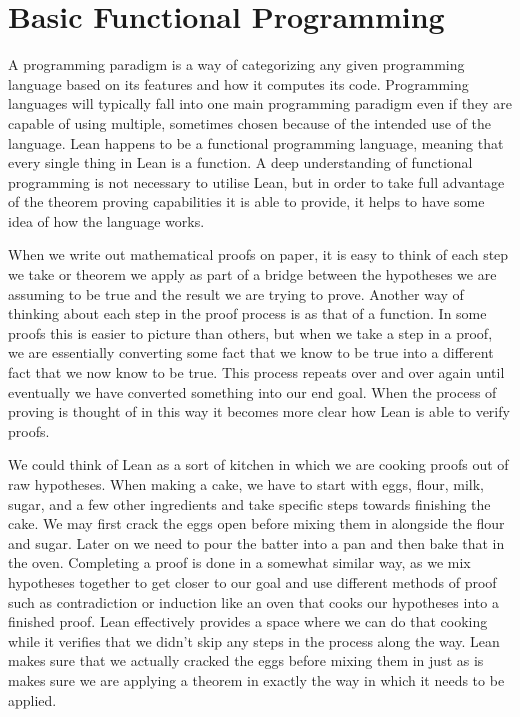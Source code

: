 \documentclass[
  letterpaper,
]{scrreprt}
\theoremstyle{remark}
\begin{document}
\hypertarget{basic-functional-programming}{%
\section{Basic Functional
Programming}\label{basic-functional-programming}}

A programming paradigm is a way of categorizing any given programming
language based on its features and how it computes its code. Programming
languages will typically fall into one main programming paradigm even if
they are capable of using multiple, sometimes chosen because of the
intended use of the language. Lean happens to be a functional
programming language, meaning that every single thing in Lean is a
function. A deep understanding of functional programming is not
necessary to utilise Lean, but in order to take full advantage of the
theorem proving capabilities it is able to provide, it helps to have
some idea of how the language works.

When we write out mathematical proofs on paper, it is easy to think of
each step we take or theorem we apply as part of a bridge between the
hypotheses we are assuming to be true and the result we are trying to
prove. Another way of thinking about each step in the proof process is
as that of a function. In some proofs this is easier to picture than
others, but when we take a step in a proof, we are essentially
converting some fact that we know to be true into a different fact that
we now know to be true. This process repeats over and over again until
eventually we have converted something into our end goal. When the
process of proving is thought of in this way it becomes more clear how
Lean is able to verify proofs.

We could think of Lean as a sort of kitchen in which we are cooking
proofs out of raw hypotheses. When making a cake, we have to start with
eggs, flour, milk, sugar, and a few other ingredients and take specific
steps towards finishing the cake. We may first crack the eggs open
before mixing them in alongside the flour and sugar. Later on we need to
pour the batter into a pan and then bake that in the oven. Completing a
proof is done in a somewhat similar way, as we mix hypotheses together
to get closer to our goal and use different methods of proof such as
contradiction or induction like an oven that cooks our hypotheses into a
finished proof. Lean effectively provides a space where we can do that
cooking while it verifies that we didn't skip any steps in the process
along the way. Lean makes sure that we actually cracked the eggs before
mixing them in just as is makes sure we are applying a theorem in
exactly the way in which it needs to be applied.
\end{document}
